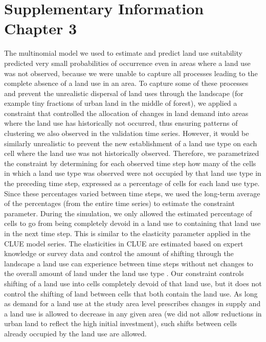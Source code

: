 \documentclass[titlesmallcaps,copyrightpage]{uomthesis}\usepackage[]{graphicx}\usepackage[]{color}
\begin{document}
\chapter{Supplementary Information Chapter 3}\label{apx:ch3}

The multinomial model we used to estimate and predict land use suitability predicted very small probabilities of occurrence even in areas where a land use was not observed, because we were unable to capture all processes leading to the complete absence of a land use in an area. To capture some of these processes and prevent the unrealistic dispersal of land uses through the landscape (for example tiny fractions of urban land in the middle of forest), we applied a constraint that controlled the allocation of changes in land demand into areas where the land use has historically not occurred, thus ensuring patterns of clustering we also observed in the validation time series. However, it would be similarly unrealistic to prevent the new establishment of a land use type on each cell where the land use was not historically observed. Therefore, we parametrized the constraint by determining for each observed time step how many of the cells in which a land use type was observed were not occupied by that land use type in the preceding time step, expressed as a percentage of cells for each land use type. Since these percentages varied between time steps, we used the long-term average of the percentages (from the entire time series) to estimate the constraint parameter. During the simulation, we only allowed the estimated percentage of cells to go from being completely devoid in a land use to containing that land use in the next time step. This is similar to the elasticity parameter applied in the CLUE model series. The elasticities in CLUE are estimated based on expert knowledge or survey data and control the amount of shifting through the landscape a land use can experience between time steps without net changes to the overall amount of land under the land use type \citep{verburg_modeling_2002}. Our constraint controls shifting of a land use into cells completely devoid of that land use, but it does not control the shifting of land between cells that both contain the land use. As long as demand for a land use at the study area level prescribes changes in supply and a land use is allowed to decrease in any given area (we did not allow reductions in urban land to reflect the high initial investment), such shifts between cells already occupied by the land use are allowed.
\end{document}
